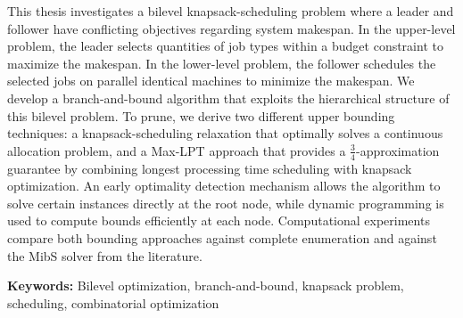 
This thesis investigates a bilevel knapsack-scheduling problem where a leader and follower have conflicting objectives regarding system makespan.
In the upper-level problem, the leader selects quantities of job types within a budget constraint to maximize the makespan.
In the lower-level problem, the follower schedules the selected jobs on parallel identical machines to minimize the makespan.
We develop a branch-and-bound algorithm that exploits the hierarchical structure of this bilevel problem.
To prune, we derive two different upper bounding techniques: a knapsack-scheduling relaxation that optimally solves a continuous allocation problem, 
and a Max-LPT approach that provides a $\frac{3}{4}$-approximation guarantee by combining longest processing time scheduling with knapsack optimization.
An early optimality detection mechanism allows the algorithm to solve certain instances directly at the root node, while dynamic programming is used to compute bounds efficiently at each node.
Computational experiments compare both bounding approaches against complete enumeration and against the MibS solver from the literature.

\textbf{Keywords:} Bilevel optimization, branch-and-bound, knapsack problem, scheduling, combinatorial optimization

